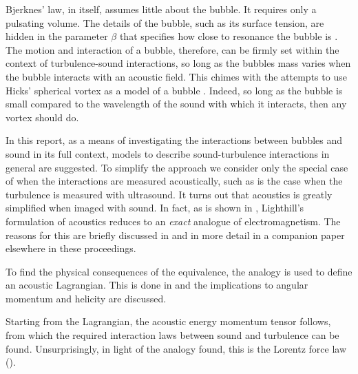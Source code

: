 Bjerknes' law, in itself, assumes little about the bubble. 
It requires only a pulsating volume.
The details of the bubble, such as its surface tension, are hidden in the parameter $\beta$ that specifies how close to resonance the bubble is \cite{Leighton1990}.
The motion and interaction of a bubble, therefore, 
can be firmly set within the context of turbulence-sound interactions, 
so long as the bubbles mass varies when the bubble interacts with an acoustic field.
This chimes with the attempts to use Hicks'  spherical vortex as a model of a bubble \cite{Levine1959}.
Indeed, so long as the bubble is small compared 
to the wavelength of the sound with which it interacts, then any vortex should do.


In this report, as a means of investigating the interactions between bubbles and sound in its full context,
models to describe sound-turbulence interactions in general are suggested.
To simplify the approach we consider only the special case of when the interactions are measured acoustically,
such as is the case when the turbulence is measured with ultrasound.
It turns out that  acoustics  is greatly simplified when imaged with sound.
In fact,
as is shown in ,
 Lighthill's formulation of acoustics reduces to an {\em exact} analogue of electromagnetism.
The reasons for this are briefly discussed in  
and in more detail in a companion paper elsewhere in these proceedings.

To find the physical consequences of the equivalence,
the analogy is used to define an acoustic Lagrangian.
This is done in  and the implications to angular momentum and helicity are discussed.

Starting from the Lagrangian, the acoustic energy momentum tensor follows,
from which the required interaction laws between sound and turbulence can be found.
Unsurprisingly, in light of the analogy found, 
this is the Lorentz force law  ().

